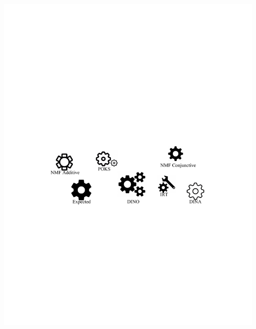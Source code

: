\documentclass{beamer}
\begin{document}
\begin{frame}
\begin{itemize}
\end{itemize}
\begin{overprint}
\vspace{-4.5cm}
      		\includegraphics[trim= 0cm 6cm 0cm 8cm ,clip = true,scale =0.6]{images/Models}

\end{overprint}
\end{frame}
\end{document}

